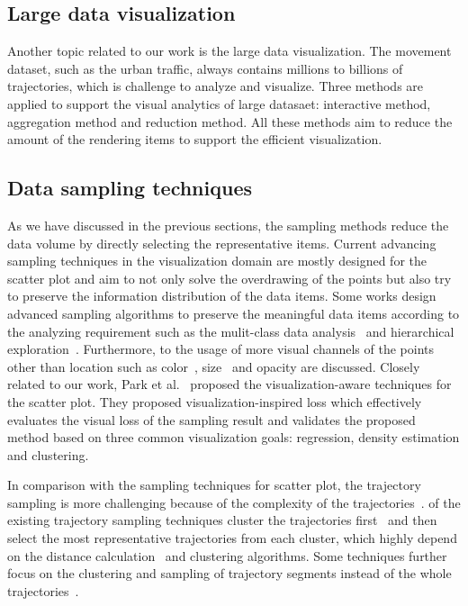 \subsection{Large data visualization}
Another topic related to our work is the large data visualization. The movement dataset, such as the urban traffic, always contains millions to billions of trajectories, which is challenge to analyze and visualize. Three methods are applied to support the visual analytics of large datasaet: interactive method, aggregation method and reduction method. All these methods aim to reduce the amount of the rendering items to support the efficient visualization. 


\subsection{Data sampling techniques}
As we have discussed in the previous sections, the sampling methods reduce the data volume by directly selecting the representative items. Current advancing sampling techniques in the visualization domain are mostly designed for the scatter plot and aim to not only solve the overdrawing of the points but also try to preserve the information distribution of the data items. 
Some works design advanced sampling algorithms to preserve the meaningful data items according to the analyzing requirement such as the mulit-class data analysis~\cite{chen2014visual} and hierarchical exploration~\cite{}. Furthermore, to the usage of more visual channels of the points other than location such as color~\cite{chen2014visual}, size~\cite{woodruff1998constant} and opacity are discussed. 
Closely related to our work, Park et al.~\cite{park2016visualization} proposed the visualization-aware techniques for the scatter plot. They proposed visualization-inspired loss which effectively evaluates the visual loss of the sampling result and validates the proposed method based on three common visualization goals:  regression, density estimation and clustering. 

In comparison with the sampling techniques for scatter plot, the trajectory sampling is more challenging because of the complexity of the trajectories~\cite{pelekis2010unsupervised}.  of the existing trajectory sampling techniques cluster the trajectories first~\cite{pelekis2009clustering} and then select the most representative trajectories from each cluster, which highly depend on the distance calculation~\cite{pelekis2007similarity} and clustering algorithms. Some techniques further focus on the clustering and sampling of trajectory segments instead of the whole trajectories~\cite{panagiotakis2011segmentation}. 
